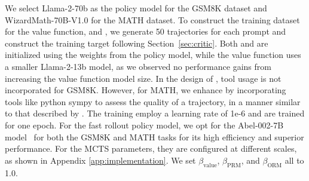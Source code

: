 


We select Llama-2-70b as the policy model for the GSM8K dataset and WizardMath-70B-V1.0 for the MATH dataset. To construct the training dataset for the value function, \prm{} and \orm{}, we generate 50 trajectories for each prompt and construct the training target following Section~\ref{sec:critic}. Both \prm{} and \orm{} are initialized using the weights from the policy model, while the value function uses a smaller Llama-2-13b model, as we observed no performance gains from increasing the value function model size. In the design of \orm{}, tool usage is not incorporated for GSM8K. However, for MATH, we enhance \orm{} by incorporating tools like python sympy to assess the quality of a trajectory, in a manner similar to that described by \citet{gou2023tora}. The training employ a learning rate of 1e-6 and are trained for one epoch. For the fast rollout policy model, we opt for the Abel-002-7B model~\citep{abel} for both the GSM8K and MATH tasks for its high efficiency and superior performance. For the MCTS parameters, they are configured at different scales, as shown in Appendix \ref{app:implementation}. We set $\beta_{\text{value}}$, $\beta_{\text{PRM}}$, and $\beta_{\text{ORM}}$ all to 1.0.


